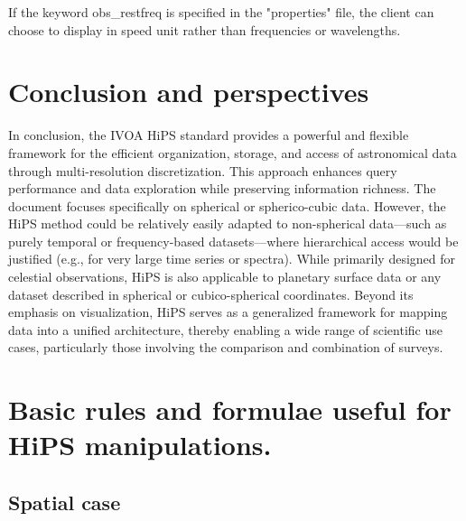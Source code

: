 \documentclass[11pt,a4paper]{ivoa}
\begin{document}
If the keyword obs\_restfreq is specified in the "properties" file, the client can choose to display in speed unit rather than frequencies or wavelengths.


\section{Conclusion and perspectives}

In conclusion, the IVOA HiPS standard provides a powerful and flexible framework for the efficient organization, storage, and access of astronomical data through multi-resolution discretization.  This approach enhances query performance and data exploration while preserving information richness.
The document focuses specifically on spherical or spherico-cubic data. However, the HiPS method could be relatively easily adapted to non-spherical data—such as purely temporal or frequency-based datasets—where hierarchical access would be justified (e.g., for very large time series or spectra).
While primarily designed for celestial observations, HiPS is also applicable to planetary surface data or any dataset described in spherical or cubico-spherical coordinates. Beyond its emphasis on visualization, HiPS serves as a generalized framework for mapping data into a unified architecture, thereby enabling a wide range of scientific use cases, particularly those involving the comparison and combination of surveys.





\appendix

\section{Basic rules and formulae useful for HiPS manipulations.}

\subsection{Spatial case}
\end{document}
